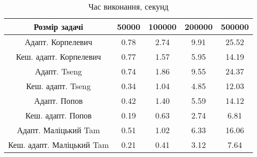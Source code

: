 \begin{table}[H]
	\centering
	\begin{tabular}{|c||c|c|c|c|}\hline
		Розмір задачі & 50000 & 100000 & 200000 & 500000 \\ \hline \hline
		Адапт. Корпелевич & 0.78 & 2.74 & 9.91 & 25.52 \\ \hline
		Кеш. адапт. Корпелевич & 0.77 & 1.57 & 5.95 & 14.19 \\ \hline
		Адапт. Tseng & 0.74 & 1.86 & 9.55 & 24.37 \\ \hline
		Кеш. адапт. Tseng & 0.34 & 1.04 & 4.85 & 12.03 \\ \hline
		Адапт. Попов & 0.42 & 1.40 & 5.59 & 14.12 \\ \hline
		Кеш. адапт. Попов & 0.19 & 0.63 & 2.74 & 6.81 \\ \hline
		Адапт. Маліцький Tam & 0.51 & 1.02 & 6.33 & 16.06 \\ \hline
		Кеш. адапт. Маліцький Tam & 0.21 & 0.41 & 3.12 & 7.64 \\ \hline
	\end{tabular}
	\caption{Час виконання, секунд}
\end{table}
